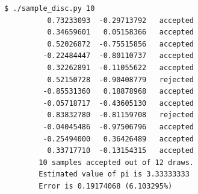 \documentclass[10pt]{article}
\begin{document}
    \begin{lstlisting}[numbers=none, basicstyle=\ttfamily]
        $ ./sample_disc.py 10
          0.73233093  -0.29713792   accepted
          0.34659601   0.05158366   accepted
          0.52026872  -0.75515856   accepted
         -0.22484447  -0.80110737   accepted
          0.32262891  -0.11055622   accepted
          0.52150728  -0.90408779   rejected
         -0.85531360   0.18878968   accepted
         -0.05718717  -0.43605130   accepted
          0.83832780  -0.81159708   rejected
         -0.04045486  -0.97506796   accepted
         -0.25494000   0.36426489   accepted
          0.33717710  -0.13154315   accepted
        10 samples accepted out of 12 draws.
        Estimated value of pi is 3.33333333
        Error is 0.19174068 (6.103295%)
    \end{lstlisting}
    
\end{document}
